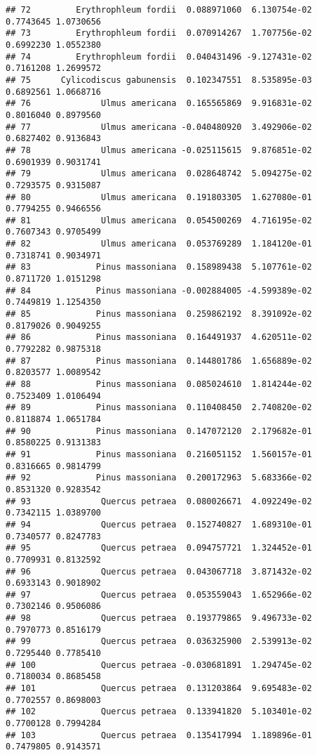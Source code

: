 \documentclass[]{article}
\begin{document}
\begin{verbatim}
## 72         Erythrophleum fordii  0.088971060  6.130754e-02 0.7743645 1.0730656
## 73         Erythrophleum fordii  0.070914267  1.707756e-02 0.6992230 1.0552380
## 74         Erythrophleum fordii  0.040431496 -9.127431e-02 0.7161208 1.2699572
## 75      Cylicodiscus gabunensis  0.102347551  8.535895e-03 0.6892561 1.0668716
## 76              Ulmus americana  0.165565869  9.916831e-02 0.8016040 0.8979560
## 77              Ulmus americana -0.040480920  3.492906e-02 0.6827402 0.9136843
## 78              Ulmus americana -0.025115615  9.876851e-02 0.6901939 0.9031741
## 79              Ulmus americana  0.028648742  5.094275e-02 0.7293575 0.9315087
## 80              Ulmus americana  0.191803305  1.627080e-01 0.7794255 0.9466556
## 81              Ulmus americana  0.054500269  4.716195e-02 0.7607343 0.9705499
## 82              Ulmus americana  0.053769289  1.184120e-01 0.7318741 0.9034971
## 83             Pinus massoniana  0.158989438  5.107761e-02 0.8711720 1.0151298
## 84             Pinus massoniana -0.002884005 -4.599389e-02 0.7449819 1.1254350
## 85             Pinus massoniana  0.259862192  8.391092e-02 0.8179026 0.9049255
## 86             Pinus massoniana  0.164491937  4.620511e-02 0.7792282 0.9875318
## 87             Pinus massoniana  0.144801786  1.656889e-02 0.8203577 1.0089542
## 88             Pinus massoniana  0.085024610  1.814244e-02 0.7523409 1.0106494
## 89             Pinus massoniana  0.110408450  2.740820e-02 0.8118874 1.0651784
## 90             Pinus massoniana  0.147072120  2.179682e-01 0.8580225 0.9131383
## 91             Pinus massoniana  0.216051152  1.560157e-01 0.8316665 0.9814799
## 92             Pinus massoniana  0.200172963  5.683366e-02 0.8531320 0.9283542
## 93              Quercus petraea  0.080026671  4.092249e-02 0.7342115 1.0389700
## 94              Quercus petraea  0.152740827  1.689310e-01 0.7340577 0.8247783
## 95              Quercus petraea  0.094757721  1.324452e-01 0.7709931 0.8132592
## 96              Quercus petraea  0.043067718  3.871432e-02 0.6933143 0.9018902
## 97              Quercus petraea  0.053559043  1.652966e-02 0.7302146 0.9506086
## 98              Quercus petraea  0.193779865  9.496733e-02 0.7970773 0.8516179
## 99              Quercus petraea  0.036325900  2.539913e-02 0.7295440 0.7785410
## 100             Quercus petraea -0.030681891  1.294745e-02 0.7180034 0.8685458
## 101             Quercus petraea  0.131203864  9.695483e-02 0.7702557 0.8698003
## 102             Quercus petraea  0.133941820  5.103401e-02 0.7700128 0.7994284
## 103             Quercus petraea  0.135417994  1.189896e-01 0.7479805 0.9143571

\end{verbatim}
\end{document}
